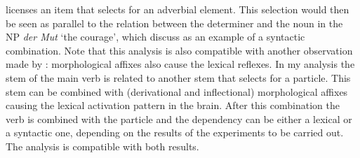 \begin{exe}
\begin{xlist}[iv.]
\begin{exe}
\begin{xlist}[iv.]
licenses an item that selects for an adverbial element. This selection would then be seen as
parallel to the relation between the determiner and the noun in the NP \emph{der Mut} `the
courage', which \citet[]{CSP2010a} discuss as an example of a syntactic combination. Note
that this analysis is also compatible with another observation made by \citet*{SPP2005a-u}:
morphological affixes also cause the lexical reflexes. In my analysis the stem of the main
verb is related to another stem that selects for a particle. This stem can be combined with
(derivational and inflectional) morphological affixes causing the lexical activation pattern in the
brain. After this combination the verb is combined with the particle and the dependency can be
either a lexical or a syntactic one, depending on the results of the experiments to be carried
out. The analysis is compatible with both results.


\end{xlist}
\end{exe}
\end{xlist}
\end{exe}
